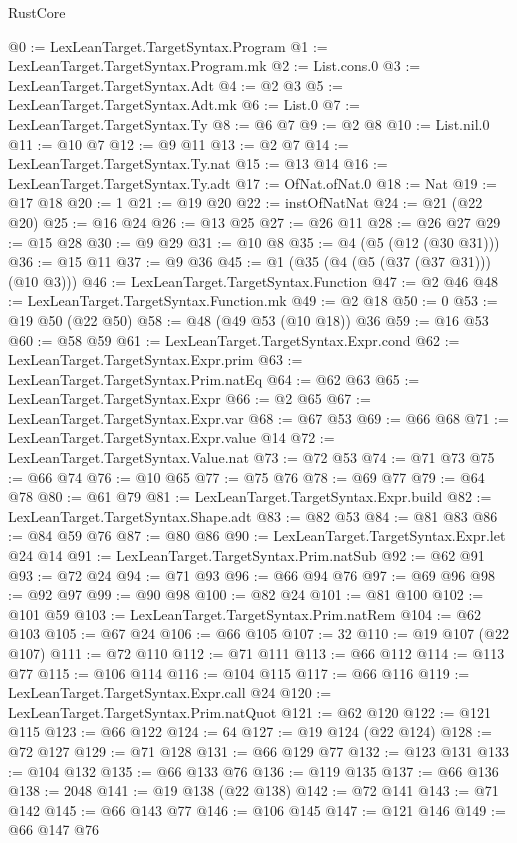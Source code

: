 \begin{lexlean}{RustCore}
\begin{coremodule}
@0 := LexLeanTarget.TargetSyntax.Program
@1 := LexLeanTarget.TargetSyntax.Program.mk
@2 := List.cons.{0}
@3 := LexLeanTarget.TargetSyntax.Adt
@4 := @2 @3
@5 := LexLeanTarget.TargetSyntax.Adt.mk
@6 := List.{0}
@7 := LexLeanTarget.TargetSyntax.Ty
@8 := @6 @7
@9 := @2 @8
@10 := List.nil.{0}
@11 := @10 @7
@12 := @9 @11
@13 := @2 @7
@14 := LexLeanTarget.TargetSyntax.Ty.nat
@15 := @13 @14
@16 := LexLeanTarget.TargetSyntax.Ty.adt
@17 := OfNat.ofNat.{0}
@18 := Nat
@19 := @17 @18
@20 := 1
@21 := @19 @20
@22 := instOfNatNat
@24 := @21 (@22 @20)
@25 := @16 @24
@26 := @13 @25
@27 := @26 @11
@28 := @26 @27
@29 := @15 @28
@30 := @9 @29
@31 := @10 @8
@35 := @4 (@5 (@12 (@30 @31)))
@36 := @15 @11
@37 := @9 @36
@45 := @1 (@35 (@4 (@5 (@37 (@37 @31))) (@10 @3)))
@46 := LexLeanTarget.TargetSyntax.Function
@47 := @2 @46
@48 := LexLeanTarget.TargetSyntax.Function.mk
@49 := @2 @18
@50 := 0
@53 := @19 @50 (@22 @50)
@58 := @48 (@49 @53 (@10 @18)) @36
@59 := @16 @53
@60 := @58 @59
@61 := LexLeanTarget.TargetSyntax.Expr.cond
@62 := LexLeanTarget.TargetSyntax.Expr.prim
@63 := LexLeanTarget.TargetSyntax.Prim.natEq
@64 := @62 @63
@65 := LexLeanTarget.TargetSyntax.Expr
@66 := @2 @65
@67 := LexLeanTarget.TargetSyntax.Expr.var
@68 := @67 @53
@69 := @66 @68
@71 := LexLeanTarget.TargetSyntax.Expr.value @14
@72 := LexLeanTarget.TargetSyntax.Value.nat
@73 := @72 @53
@74 := @71 @73
@75 := @66 @74
@76 := @10 @65
@77 := @75 @76
@78 := @69 @77
@79 := @64 @78
@80 := @61 @79
@81 := LexLeanTarget.TargetSyntax.Expr.build
@82 := LexLeanTarget.TargetSyntax.Shape.adt
@83 := @82 @53
@84 := @81 @83
@86 := @84 @59 @76
@87 := @80 @86
@90 := LexLeanTarget.TargetSyntax.Expr.let @24 @14
@91 := LexLeanTarget.TargetSyntax.Prim.natSub
@92 := @62 @91
@93 := @72 @24
@94 := @71 @93
@96 := @66 @94 @76
@97 := @69 @96
@98 := @92 @97
@99 := @90 @98
@100 := @82 @24
@101 := @81 @100
@102 := @101 @59
@103 := LexLeanTarget.TargetSyntax.Prim.natRem
@104 := @62 @103
@105 := @67 @24
@106 := @66 @105
@107 := 32
@110 := @19 @107 (@22 @107)
@111 := @72 @110
@112 := @71 @111
@113 := @66 @112
@114 := @113 @77
@115 := @106 @114
@116 := @104 @115
@117 := @66 @116
@119 := LexLeanTarget.TargetSyntax.Expr.call @24
@120 := LexLeanTarget.TargetSyntax.Prim.natQuot
@121 := @62 @120
@122 := @121 @115
@123 := @66 @122
@124 := 64
@127 := @19 @124 (@22 @124)
@128 := @72 @127
@129 := @71 @128
@131 := @66 @129 @77
@132 := @123 @131
@133 := @104 @132
@135 := @66 @133 @76
@136 := @119 @135
@137 := @66 @136
@138 := 2048
@141 := @19 @138 (@22 @138)
@142 := @72 @141
@143 := @71 @142
@145 := @66 @143 @77
@146 := @106 @145
@147 := @121 @146
@149 := @66 @147 @76

\end{coremodule}
\end{lexlean}
